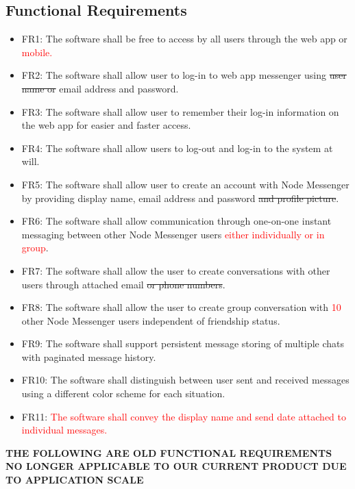 \documentclass[12pt, titlepage]{article}
\begin{document}
    	\subsection{Functional Requirements}
	    \begin{itemize}
		    \item FR1: The software shall be free to access by all users through the web app or \textcolor{red}{ mobile.}
		    \item FR2: The software shall allow user to log-in to web app messenger using \sout{user name or} email address and password.
		    \item FR3: The software shall allow user to remember their log-in information on the web app for easier and faster access.
		    \item FR4: The software shall allow users to log-out and log-in to the system at will.
		    \item FR5: The software shall allow user to create an account with Node Messenger by providing display name, email address and password \sout{and profile picture}.
		    \item FR6: The software shall allow communication through one-on-one instant messaging between other Node Messenger users \textcolor{red}{either individually or in group}.
		    \item FR7: The software shall allow the user to create conversations with other users through attached email \sout{ or phone numbers}.
		    \item FR8: The software shall allow the user to create group conversation with \textcolor{red}{10} other Node Messenger users independent of friendship status.
		    \item FR9: The software shall support persistent message storing of multiple chats with paginated message history.
		    \item FR10: The software shall distinguish between user sent and received messages using a different color scheme for each situation.
		    \item FR11: \textcolor{red}{The software shall convey the display name and send date attached to individual messages.}
		    
	\end{itemize}
	
\textbf{THE FOLLOWING ARE OLD FUNCTIONAL REQUIREMENTS NO LONGER APPLICABLE TO OUR CURRENT PRODUCT DUE TO APPLICATION SCALE}\\
		
\end{document}
